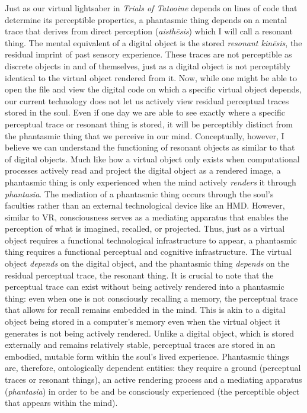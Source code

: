 \documentclass{article}
\begin{document}
Just as our virtual lightsaber in \textit{Trials of Tatooine} depends on lines of code that determine its perceptible properties, a phantasmic thing depends on a mental trace that derives from direct perception (\textit{aisthēsis}) which I will call a resonant thing. The mental equivalent of a digital object is the stored \textit{resonant kinēsis}, the residual imprint of past sensory experience. These traces are not perceptible as discrete objects in and of themselves, just as a digital object is not perceptibly identical to the virtual object rendered from it. Now, while one might be able to open the file and view the digital code on which a specific virtual object depends, our current technology does not let us actively view residual perceptual traces stored in the soul. Even if one day we are able to see exactly where a specific perceptual trace or resonant thing is stored, it will be perceptibly distinct from the phantasmic thing that we perceive in our mind. Conceptually, however, I believe we can understand the functioning of resonant objects as similar to that of digital objects. Much like how a virtual object only exists when computational processes actively read and project the digital object as a rendered image, a phantasmic thing is only experienced when the mind actively \textit{renders} it through \textit{phantasia}. The mediation of a phantasmic thing occurs through the soul's faculties rather than an external technological device like an HMD. However, similar to VR, consciousness serves as a mediating apparatus that enables the perception of what is imagined, recalled, or projected. Thus, just as a virtual object requires a functional technological infrastructure to appear, a phantasmic thing requires a functional perceptual and cognitive infrastructure. The virtual object \textit{depends} on the digital object, and the phantasmic thing \textit{depends} on the residual perceptual trace, the resonant thing. It is crucial to note that the perceptual trace can exist without being actively rendered into a phantasmic thing: even when one is not consciously recalling a memory, the perceptual trace that allows for recall remains embedded in the mind. This is akin to a digital object being stored in a computer's memory even when the virtual object it generates is not being actively rendered. Unlike a digital object, which is stored externally and remains relatively stable, perceptual traces are stored in an embodied, mutable form within the soul's lived experience. Phantasmic things are, therefore, ontologically dependent entities: they require a ground (perceptual traces or resonant things), an active rendering process and a mediating apparatus (\textit{phantasia}) in order to be and be consciously experienced (the perceptible object that appears within the mind).
\end{document}
